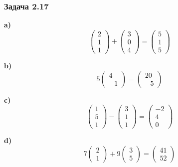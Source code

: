 \documentclass{subfiles}
\begin{document}
\subsubsection{Задача 2.17}

\noindent \textbf{a)}
\begin{equation*}
    \left(\begin{array}{ c }2 \\ 1 \\ 1\end{array}\right) +
    \left(\begin{array}{ c }3 \\ 0 \\ 4\end{array}\right) =
    \left(\begin{array}{ c }5 \\ 1 \\ 5\end{array}\right)
\end{equation*}

\noindent \textbf{b)}
\begin{equation*}
    5
    \left(\begin{array}{ c } 4 \\ -1 \end{array}\right) =
    \left(\begin{array}{ c } 20 \\ -5 \end{array}\right)
\end{equation*}

\noindent \textbf{c)}
\begin{equation*}
    \left(\begin{array}{ c }1 \\ 5 \\ 1\end{array}\right) -
    \left(\begin{array}{ c }3 \\ 1 \\ 1\end{array}\right) =
    \left(\begin{array}{ c }-2 \\ 4 \\ 0\end{array}\right)
\end{equation*}

\noindent \textbf{d)}
\begin{equation*}
    7 \left(\begin{array}{ c }2 \\ 1 \end{array}\right) +
    9 \left(\begin{array}{ c }3 \\ 5 \end{array}\right) =
    \left(\begin{array}{ c }41 \\ 52 \end{array}\right)
\end{equation*}
\end{document}
